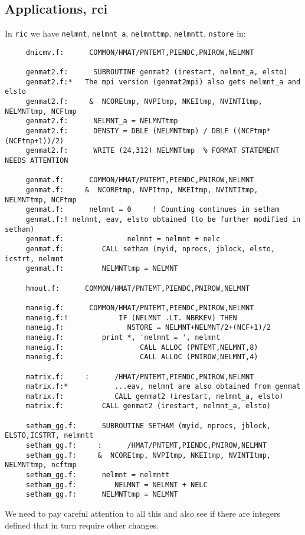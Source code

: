 \documentclass[a4paper,titlepage]{article}
\begin{document}
\subsection*{Applications, rci}
In \verb+ric+ we have \verb+nelmnt+, \verb+nelmnt_a+, \verb+nelmnttmp+, \verb+nelmntt+,
\verb+nstore+ in:
\begin{verbatim}
     dnicmv.f:      COMMON/HMAT/PNTEMT,PIENDC,PNIROW,NELMNT
     
     genmat2.f:      SUBROUTINE genmat2 (irestart, nelmnt_a, elsto)
     genmat2.f:*   The mpi version (genmat2mpi) also gets nelmnt_a and elsto
     genmat2.f:     &  NCOREtmp, NVPItmp, NKEItmp, NVINTItmp, NELMNTtmp, NCFtmp
     genmat2.f:      NELMNT_a = NELMNTtmp
     genmat2.f:      DENSTY = DBLE (NELMNTtmp) / DBLE ((NCFtmp*(NCFtmp+1))/2)
     genmat2.f:      WRITE (24,312) NELMNTtmp  % FORMAT STATEMENT NEEDS ATTENTION
		
     genmat.f:      COMMON/HMAT/PNTEMT,PIENDC,PNIROW,NELMNT
     genmat.f:     &  NCOREtmp, NVPItmp, NKEItmp, NVINTItmp, NELMNTtmp, NCFtmp
     genmat.f:      nelmnt = 0     ! Counting continues in setham
     genmat.f:! nelmnt, eav, elsto obtained (to be further modified in setham)
     genmat.f:               nelmnt = nelmnt + nelc
     genmat.f:         CALL setham (myid, nprocs, jblock, elsto, icstrt, nelmnt   
     genmat.f:         NELMNTtmp = NELMNT
		
     hmout.f:      COMMON/HMAT/PNTEMT,PIENDC,PNIROW,NELMNT
		
     maneig.f:      COMMON/HMAT/PNTEMT,PIENDC,PNIROW,NELMNT
     maneig.f:!            IF (NELMNT .LT. NBRKEV) THEN
     maneig.f:               NSTORE = NELMNT+NELMNT/2+(NCF+1)/2
     maneig.f:         print *, 'nelmnt = ', nelmnt
     maneig.f:                  CALL ALLOC (PNTEMT,NELMNT,8)
     maneig.f:                  CALL ALLOC (PNIROW,NELMNT,4)
		
     matrix.f:     :      /HMAT/PNTEMT,PIENDC,PNIROW,NELMNT
     matrix.f:*           ...eav, nelmnt are also obtained from genmat
     matrix.f:            CALL genmat2 (irestart, nelmnt_a, elsto)
     matrix.f:         CALL genmat2 (irestart, nelmnt_a, elsto)
		
     setham_gg.f:      SUBROUTINE SETHAM (myid, nprocs, jblock, ELSTO,ICSTRT, nelmntt
     setham_gg.f:     :      /HMAT/PNTEMT,PIENDC,PNIROW,NELMNT
     setham_gg.f:     &  NCOREtmp, NVPItmp, NKEItmp, NVINTItmp, NELMNTtmp, ncftmp
     setham_gg.f:      nelmnt = nelmntt                           
     setham_gg.f:         NELMNT = NELMNT + NELC
     setham_gg.f:      NELMNTtmp = NELMNT
\end{verbatim}
We need to pay careful attention to all this and also see if there are integers defined that in turn require other changes. 
\end{document}
